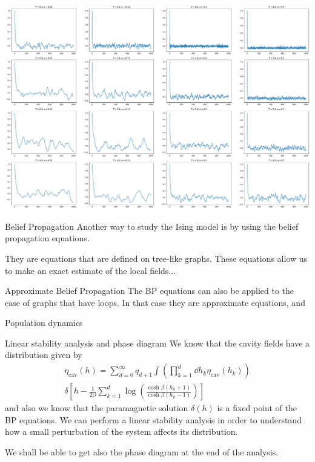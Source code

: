 \documentclass[handout]{beamer}
\begin{document}
\begin{frame}[plain]
    \includegraphics[width=\textwidth]{wolff_mags}
\end{frame}

\begin{frame}{Belief Propagation}
    Another way to study the Ising model is by using the \alert{belief
    propagation} equations.

    They are equations that are defined on tree-like graphs. These equations
    allow us to make an exact estimate of the local fields...
\end{frame}

\begin{frame}{Approximate Belief Propagation}
    The BP equations can also be applied to the case of graphs that have loops.
    In that case they are approximate equations, and
\end{frame}

\begin{frame}{Population dynamics}
\end{frame}

\begin{frame}{Linear stability analysis and phase diagram}
    We know that the cavity fields have a distribution given by
    \begin{multline}
        \eta_{\text{cav}}(h) =
        \sum_{d=0}^{\infty} q_{d+1}
        \int \left( \prod_{k=1}^d \dd{h_k} \eta_{\text{cav}} (h_k) \right) \\
        \delta \left[ h - \frac{1}{2\beta} \sum_{k=1}^d
            \log\left( \frac{\cosh{\beta(h_k+1)}}{\cosh{\beta(h_k-1)}} \right)
        \right]
        \label{eq:cav_field_distrib}
    \end{multline}
    and also we know that the paramagnetic solution $\delta(h)$ is a
    \alert{fixed point} of the BP equations. We can perform a \alert{linear
    stability analysis} in order to understand how a small perturbation of the
    system affects its distribution.

    We shall be able to get also the phase diagram at the end of the analysis.
\end{frame}
\end{document}
